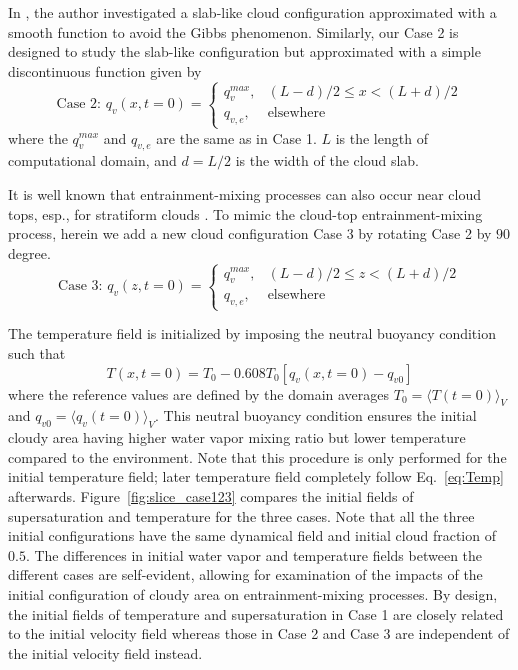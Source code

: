 \documentclass[draft,linenumbers]{agujournal}
\newcommand{\Eq}[1]{Eq.~\eqref{#1}}
\newcommand{\Fig}[1]{Figure~\ref{#1}}
\begin{document}
In \citet{Kumar11}, the author investigated a slab-like cloud configuration approximated with a smooth function to avoid the Gibbs phenomenon. Similarly, our Case 2 is designed to study the slab-like configuration but approximated with a simple discontinuous function given by
\begin{equation}
\mbox{Case 2: } q_v(x,t=0) = 
\left\{\begin{array}{lr}
q_v^{max}, & (L-d)/2 \le x < (L+d)/2\\
q_{v,e}, & \mbox{elsewhere}
\end{array}\right.\label{case2}
\end{equation}
where the $q_v^{max}$ and $q_{v,e}$ are the same as in Case 1.
$L$ is the length of computational domain, and $d = L/2$ is the width of the cloud slab.

It is well known that entrainment-mixing processes can also occur near cloud tops, esp., for stratiform clouds \citep{Lu2011, Yum2015}. To mimic the cloud-top entrainment-mixing process, herein we add a new cloud configuration Case 3 by rotating Case 2 by $90$ degree.
\begin{equation}
\mbox{Case 3: } q_v(z,t=0) = 
\left\{\begin{array}{lr}
q_v^{max}, & (L-d)/2 \le z < (L+d)/2\\
q_{v,e}, & \mbox{elsewhere}
\end{array}\right.\label{case3}
\end{equation}

The temperature field is initialized by imposing the neutral buoyancy condition such that \citep{Kumar14}
\begin{equation}
T(x,t = 0) = T_0 - 0.608T_0[q_v(x,t = 0) - q_{v0}]
\end{equation}
where the reference values are defined by the domain averages $T_0 = \langle T(t=0)\rangle_V$ and $q_{v0} = \langle q_v(t=0)\rangle_V$. This neutral buoyancy condition ensures the initial cloudy area having higher water vapor mixing ratio but lower temperature compared to the environment. Note that this procedure is only performed for the initial temperature field; later temperature field completely follow \Eq{eq:Temp} afterwards. \Fig{fig:slice_case123} compares the initial fields of  supersaturation and temperature for the three cases. {\color{green}Note that all the three initial 
configurations have the same dynamical field and initial cloud fraction of $0.5$.} The differences in initial water vapor 
and temperature fields between the different cases are self-evident, allowing for examination of the impacts of the initial 
configuration of cloudy area on entrainment-mixing processes.
{\color{green}By design, the initial fields of temperature and supersaturation in Case 1 are closely related to the initial velocity field whereas those in Case 2 and Case 3 are independent of the initial velocity field instead.}
\end{document}
